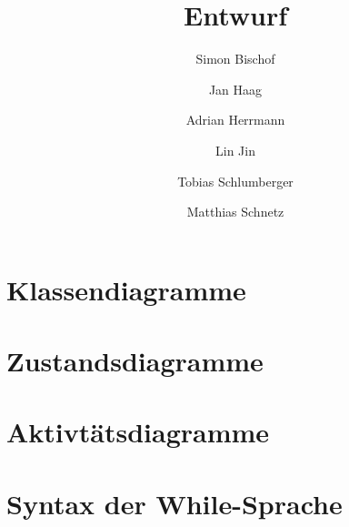 \documentclass[10pt,a4paper,titlepage]{article}
\title{Entwurf}
\author{Simon Bischof \and Jan Haag \and Adrian Herrmann \and Lin Jin \and Tobias Schlumberger \and Matthias Schnetz}
\begin{document}
\maketitle
\section{Klassendiagramme}
\section{Zustandsdiagramme}
\section{Aktivtätsdiagramme}
\newpage
\section{Syntax der While-Sprache}
\end{document}
